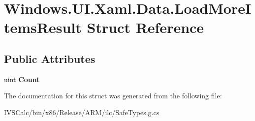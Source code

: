 \hypertarget{struct_windows_1_1_u_i_1_1_xaml_1_1_data_1_1_load_more_items_result}{}\section{Windows.\+U\+I.\+Xaml.\+Data.\+Load\+More\+Items\+Result Struct Reference}
\label{struct_windows_1_1_u_i_1_1_xaml_1_1_data_1_1_load_more_items_result}
\subsection*{Public Attributes}
\begin{DoxyCompactItemize}
\item 
\mbox{\label{struct_windows_1_1_u_i_1_1_xaml_1_1_data_1_1_load_more_items_result_a15a4d3ef28ca8bd994c0931cd0cfaf60}} 
uint {\bfseries Count}
\end{DoxyCompactItemize}


The documentation for this struct was generated from the following file\+:\begin{DoxyCompactItemize}
\item 
I\+V\+S\+Calc/bin/x86/\+Release/\+A\+R\+M/ilc/Safe\+Types.\+g.\+cs\end{DoxyCompactItemize}
